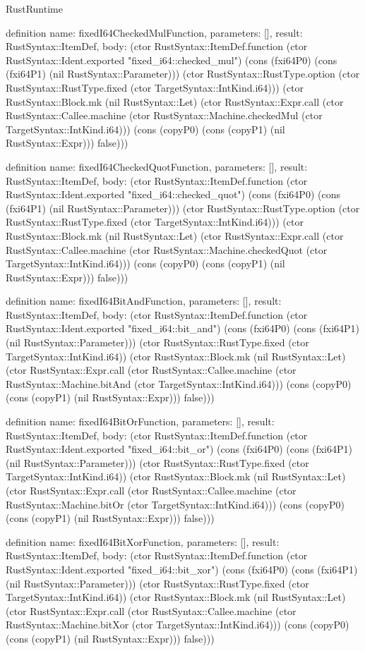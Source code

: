 \begin{lexlean}{RustRuntime}
\begin{semanticmodule}
definition{
  name: fixedI64CheckedMulFunction,
  parameters: [],
  result: RustSyntax::ItemDef,
  body: (ctor RustSyntax::ItemDef.function (ctor RustSyntax::Ident.exported "fixed_i64::checked_mul") (cons (fxi64P0) (cons (fxi64P1) (nil RustSyntax::Parameter))) (ctor RustSyntax::RustType.option (ctor RustSyntax::RustType.fixed (ctor TargetSyntax::IntKind.i64))) (ctor RustSyntax::Block.mk (nil RustSyntax::Let) (ctor RustSyntax::Expr.call (ctor RustSyntax::Callee.machine (ctor RustSyntax::Machine.checkedMul (ctor TargetSyntax::IntKind.i64))) (cons (copyP0) (cons (copyP1) (nil RustSyntax::Expr))) false)))
}

definition{
  name: fixedI64CheckedQuotFunction,
  parameters: [],
  result: RustSyntax::ItemDef,
  body: (ctor RustSyntax::ItemDef.function (ctor RustSyntax::Ident.exported "fixed_i64::checked_quot") (cons (fxi64P0) (cons (fxi64P1) (nil RustSyntax::Parameter))) (ctor RustSyntax::RustType.option (ctor RustSyntax::RustType.fixed (ctor TargetSyntax::IntKind.i64))) (ctor RustSyntax::Block.mk (nil RustSyntax::Let) (ctor RustSyntax::Expr.call (ctor RustSyntax::Callee.machine (ctor RustSyntax::Machine.checkedQuot (ctor TargetSyntax::IntKind.i64))) (cons (copyP0) (cons (copyP1) (nil RustSyntax::Expr))) false)))
}

definition{
  name: fixedI64BitAndFunction,
  parameters: [],
  result: RustSyntax::ItemDef,
  body: (ctor RustSyntax::ItemDef.function (ctor RustSyntax::Ident.exported "fixed_i64::bit_and") (cons (fxi64P0) (cons (fxi64P1) (nil RustSyntax::Parameter))) (ctor RustSyntax::RustType.fixed (ctor TargetSyntax::IntKind.i64)) (ctor RustSyntax::Block.mk (nil RustSyntax::Let) (ctor RustSyntax::Expr.call (ctor RustSyntax::Callee.machine (ctor RustSyntax::Machine.bitAnd (ctor TargetSyntax::IntKind.i64))) (cons (copyP0) (cons (copyP1) (nil RustSyntax::Expr))) false)))
}

definition{
  name: fixedI64BitOrFunction,
  parameters: [],
  result: RustSyntax::ItemDef,
  body: (ctor RustSyntax::ItemDef.function (ctor RustSyntax::Ident.exported "fixed_i64::bit_or") (cons (fxi64P0) (cons (fxi64P1) (nil RustSyntax::Parameter))) (ctor RustSyntax::RustType.fixed (ctor TargetSyntax::IntKind.i64)) (ctor RustSyntax::Block.mk (nil RustSyntax::Let) (ctor RustSyntax::Expr.call (ctor RustSyntax::Callee.machine (ctor RustSyntax::Machine.bitOr (ctor TargetSyntax::IntKind.i64))) (cons (copyP0) (cons (copyP1) (nil RustSyntax::Expr))) false)))
}

definition{
  name: fixedI64BitXorFunction,
  parameters: [],
  result: RustSyntax::ItemDef,
  body: (ctor RustSyntax::ItemDef.function (ctor RustSyntax::Ident.exported "fixed_i64::bit_xor") (cons (fxi64P0) (cons (fxi64P1) (nil RustSyntax::Parameter))) (ctor RustSyntax::RustType.fixed (ctor TargetSyntax::IntKind.i64)) (ctor RustSyntax::Block.mk (nil RustSyntax::Let) (ctor RustSyntax::Expr.call (ctor RustSyntax::Callee.machine (ctor RustSyntax::Machine.bitXor (ctor TargetSyntax::IntKind.i64))) (cons (copyP0) (cons (copyP1) (nil RustSyntax::Expr))) false)))
}


\end{semanticmodule}
\end{lexlean}
